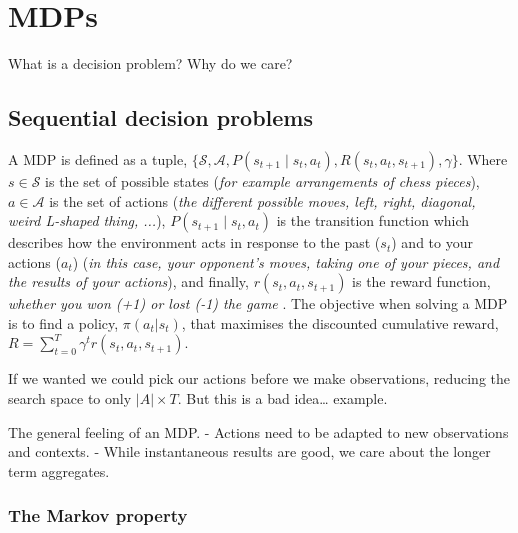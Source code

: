\chapter{MDPs}

What is a decision problem?
Why do we care?

\hypertarget{sequential-decision-problems}{%
\section{Sequential decision
problems}\label{sequential-decision-problems}}


A MDP is defined as a tuple, \(\{\mathcal S, \mathcal A, P(s_{t+1} \mid s_t, a_t),R(s_t, a_t, s_{t+1}), \gamma\}\)\footnotemark[1]. Where \(s \in \mathcal S\) is the set of possible states (\textit{for example arrangements of chess pieces}), \(a \in \mathcal A\) is the set of actions (\textit{the different possible moves, left, right, diagonal, weird L-shaped thing, ...}),  \(P(s_{t+1} \mid s_t, a_t)\) is the transition function which describes how the environment acts in response to the past (\(s_t\)) and to your actions (\(a_t\)) (\textit{in this case, your opponent's moves, taking one of your pieces, and the results of your actions}), and finally, \(r(s_t, a_t, s_{t+1})\) is the reward function, \textit{whether you won (+1) or lost (-1) the game }.
The objective when solving a MDP is to find a policy, $\pi(a_t | s_t)$, that maximises the discounted cumulative reward, \(R =\sum_{t=0}^T \gamma^t r(s_t, a_t, s_{t+1}) \).


If we wanted we could pick our actions before we make observations,
reducing the search space to only \(|A| \times T\). But this is a bad idea\ldots{} example.

The general feeling of an MDP. - Actions need to be adapted to new
observations and contexts. - While instantaneous results are good, we
care about the longer term aggregates.

\hypertarget{the-markov-property}{%
\subsection{The Markov property}\label{the-markov-property}}

